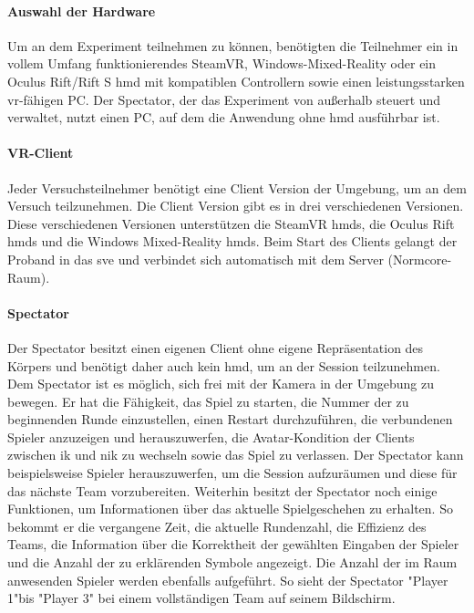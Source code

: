 \documentclass[a4paper,11pt]{article}%
\renewcommand{\\}{\vspace*{0.5\baselineskip} \newline}
\begin{document}
\paragraph{Auswahl der Hardware}
Um an dem Experiment teilnehmen zu können, benötigten die Teilnehmer ein in vollem Umfang funktionierendes SteamVR, Windows-Mixed-Reality oder ein Oculus Rift/Rift S \ac{hmd} mit kompatiblen Controllern sowie einen leistungsstarken \ac{vr}-fähigen PC. Der Spectator, der das Experiment von außerhalb steuert und verwaltet, nutzt einen PC, auf dem die Anwendung ohne \ac{hmd} ausführbar ist.

\paragraph{VR-Client}
Jeder Versuchsteilnehmer benötigt eine Client Version der Umgebung, um an dem Versuch teilzunehmen. Die Client Version gibt es in drei verschiedenen Versionen. Diese verschiedenen Versionen unterstützen die SteamVR \ac{hmd}s, die Oculus Rift \ac{hmd}s und die Windows Mixed-Reality \ac{hmd}s. Beim Start des Clients gelangt der Proband in das \ac{sve} und verbindet sich automatisch mit dem Server (Normcore-Raum).

\paragraph{Spectator}
Der Spectator besitzt einen eigenen Client ohne eigene Repräsentation des Körpers und benötigt daher auch kein \ac{hmd}, um an der Session teilzunehmen. Dem Spectator ist es möglich, sich frei mit der Kamera in der Umgebung zu bewegen.
Er hat die Fähigkeit, das Spiel zu starten, die Nummer der zu beginnenden Runde einzustellen, einen Restart durchzuführen, die verbundenen Spieler anzuzeigen und herauszuwerfen, die Avatar-Kondition der Clients zwischen \ac{ik} und \ac{nik} zu wechseln sowie das Spiel zu verlassen.
Der Spectator kann beispielsweise Spieler herauszuwerfen, um die Session aufzuräumen und diese für das nächste Team vorzubereiten. Weiterhin besitzt der Spectator noch einige Funktionen, um Informationen über das aktuelle Spielgeschehen zu erhalten. So bekommt er die vergangene Zeit, die aktuelle Rundenzahl, die Effizienz des Teams, die Information über die Korrektheit der gewählten Eingaben der Spieler und die Anzahl der zu erklärenden Symbole angezeigt. Die Anzahl der im Raum anwesenden Spieler werden ebenfalls aufgeführt. So sieht der Spectator "Player 1"bis "Player 3" bei einem vollständigen Team auf seinem Bildschirm. 
\end{document}
